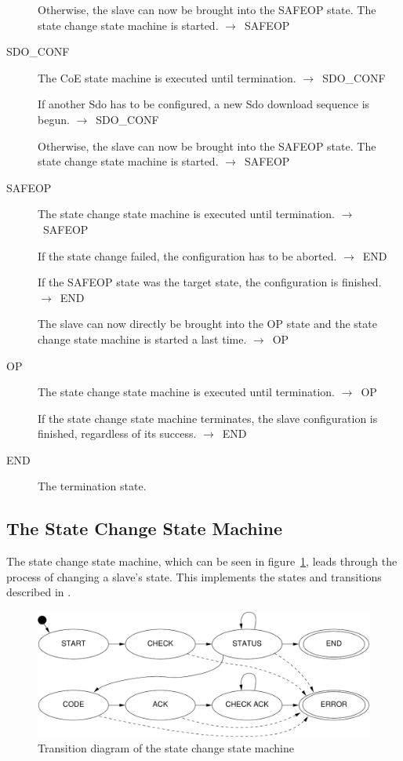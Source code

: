 \documentclass[a4paper,12pt,BCOR6mm,bibtotoc,idxtotoc]{scrbook}
\begin{document}
\begin{description}
  Otherwise, the slave can now be brought into the SAFEOP state. The
  state change state machine is started.
  $\rightarrow$~SAFEOP

\item[SDO\_CONF] The CoE state machine is executed until termination.
  $\rightarrow$~SDO\_CONF

  If another Sdo has to be configured, a new Sdo download sequence is
  begun. $\rightarrow$~SDO\_CONF

  Otherwise, the slave can now be brought into the SAFEOP state. The
  state change state machine is started.
  $\rightarrow$~SAFEOP

\item[SAFEOP] The state change state machine is executed until
  termination. $\rightarrow$~SAFEOP

  If the state change failed, the configuration has to be aborted.
  $\rightarrow$~END

  If the SAFEOP state was the target state, the configuration is
  finished. $\rightarrow$~END

  The slave can now directly be brought into the OP state and the
  state change state machine is started a last time.
  $\rightarrow$~OP

\item[OP] The state change state machine is executed until
  termination. $\rightarrow$~OP

  If the state change state machine terminates, the slave
  configuration is finished, regardless of its success.
  $\rightarrow$~END

\item[END] The termination state.

\end{description}


\subsection{The State Change State Machine}
\label{sec:fsm-change}

The state change state machine, which can be seen in
figure~\ref{fig:fsm-change}, leads through the process of changing a
slave's state. This implements the states and transitions described in
\cite[section~6.4.1]{alspec}.

\begin{figure}[htbp]
  \centering
  \includegraphics[width=.9\textwidth]{images/fsm-change}
  \caption{Transition diagram of the state change state machine}
  \label{fig:fsm-change}
\end{figure}
\end{document}
